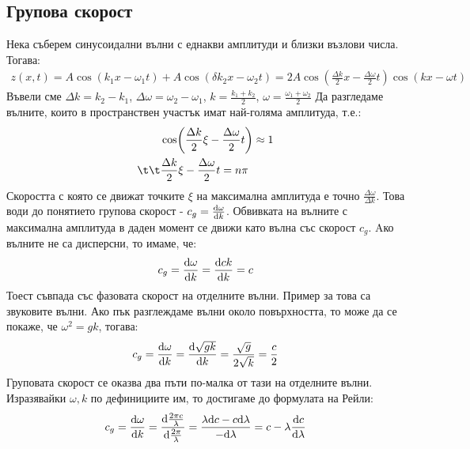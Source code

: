 \subsection{Групова скорост}
Нека съберем синусоидални вълни с еднакви амплитуди и близки възлови числа. Тогава:
\begin{align*}
  z(x, t) = A \cos (k_1 x - \omega_1 t) + A \cos (\delta k_2 x - \omega_2 t) = 2 A \cos (\frac{\Delta k}{2} x - \frac{\Delta \omega}{2} t) \cos (k x - \omega t)
\end{align*}
Въвели сме $\Delta k = k_2 - k_1$, $\Delta \omega = \omega_2 - \omega_1$, $k = \frac {k_1 + k_2}{2}$, $\omega = \frac{\omega_1 + \omega_2}{2}$
Да разгледаме вълните, които в пространствен участък имат най-голяма амплитуда, т.е.:
\begin{align*}
  &\cos (\frac{\Delta k}{2} \xi - \frac{\Delta \omega}{2} t) \approx 1 \\
\t\t&\frac{\Delta k}{2} \xi - \frac{\Delta \omega}{2} t = n \pi
\end{align*}
Скоростта с която се движат точките $\xi$ на максимална амплитуда е точно $\frac{\Delta \omega}{\Delta k}$.
Това води до понятието групова скорост - $c_g = \dv{\omega}{k}$.
Обвивката на вълните с максимална амплитуда в даден момент се движи като вълна със скорост $c_g$.
Aко вълните не са дисперсни, то имаме, че:
\begin{equation*}
  c_g = \dv{\omega}{k} = \dv{c k}{k} = c
\end{equation*}
Тоест съвпада със фазовата скорост на отделните вълни. Пример за това са звуковите вълни.
Ако пък разглеждаме вълни около повърхността, то може да се покаже, че $\omega^2 = g k$, тогава:
\begin{equation*}
  c_g = \dv{\omega}{k} = \dv{\sqrt{g k}}{k} = \frac{\sqrt{g}}{2 \sqrt{k}} = \frac{c}{2}
\end{equation*}
Груповата скорост се оказва два пъти по-малка от тази на отделните вълни.
Изразявайки $\omega, k$ по дефинициите им, то достигаме до формулата на Рейли:
\begin{equation}
  c_g = \dv{\omega}{k} = \dv{\frac{2 \pi c}{\lambda}}{\frac{2 \pi}{\lambda}} = \frac{\lambda \dd c - c \dd \lambda}{- \dd \lambda} = c - \lambda \dv{c}{\lambda}
\end{equation}


